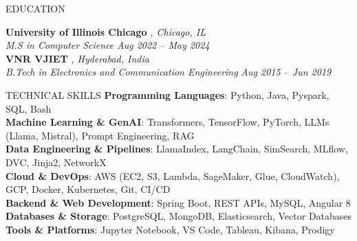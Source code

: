 \documentclass{resume} %
\begin{document}
\vspace{0.0 em}

\begin{rSection}{EDUCATION}

{\bf University of Illinois Chicago} \textit{, Chicago, IL} \\
\textit{M.S in Computer Science} \hfill \textit{Aug 2022 – May 2024} \\
\vspace{-0.3em}
{\bf VNR VJIET} \textit{, Hyderabad, India} \\
\textit{B.Tech in Electronics and Communication Engineering} \hfill \textit{Aug 2015 – Jun 2019}

\end{rSection}

\vspace{-0.2em}
\begin{rSection}{TECHNICAL SKILLS}
\textbf{Programming Languages}: Python, Java, Pyspark, SQL, Bash \\
\textbf{Machine Learning \& GenAI}: Transformers, TensorFlow, PyTorch, LLMs (Llama, Mistral), Prompt Engineering, RAG \\
\textbf{Data Engineering \& Pipelines}:  LlamaIndex, LangChain, SimSearch, MLflow, DVC, Jinja2, NetworkX \\
\textbf{Cloud \& DevOps}: AWS (EC2, S3, Lambda, SageMaker, Glue, CloudWatch), GCP, Docker, Kubernetes, Git, CI/CD \\
\textbf{Backend \& Web Development}: Spring Boot, REST APIs, MySQL, Angular 8 \\
\textbf{Databases \& Storage}: PostgreSQL, MongoDB, Elasticsearch, Vector Databases \\
\textbf{Tools \& Platforms}: Jupyter Notebook, VS Code, Tableau, Kibana, Prodigy
\end{rSection}
\end{document}

